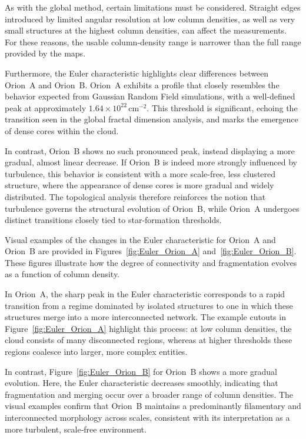 As with the global method, certain limitations must be considered.  
Straight edges introduced by limited angular resolution at low column densities, as well as very small structures at the highest column densities, can affect the measurements.  
For these reasons, the usable column‑density range is narrower than the full range provided by the maps.

Furthermore, the Euler characteristic highlights clear differences between Orion~A and Orion~B.  
Orion~A exhibits a profile that closely resembles the behavior expected from Gaussian Random Field simulations, with a well-defined peak at approximately \(1.64 \times 10^{22}\,\mathrm{cm}^{-2}\).  
This threshold is significant, echoing the transition seen in the global fractal dimension analysis, and marks the emergence of dense cores within the cloud.

In contrast, Orion~B shows no such pronounced peak, instead displaying a more gradual, almost linear decrease.  
If Orion~B is indeed more strongly influenced by turbulence, this behavior is consistent with a more scale-free, less clustered structure, where the appearance of dense cores is more gradual and widely distributed.  
The topological analysis therefore reinforces the notion that turbulence governs the structural evolution of Orion~B, while Orion~A undergoes distinct transitions closely tied to star-formation thresholds.

Visual examples of the changes in the Euler characteristic for Orion~A and Orion~B are provided in Figures~\ref{fig:Euler_Orion_A} and~\ref{fig:Euler_Orion_B}.  
These figures illustrate how the degree of connectivity and fragmentation evolves as a function of column density.  

In Orion~A, the sharp peak in the Euler characteristic corresponds to a rapid transition from a regime dominated by isolated structures to one in which these structures merge into a more interconnected network.  
The example cutouts in Figure~\ref{fig:Euler_Orion_A} highlight this process: at low column densities, the cloud consists of many disconnected regions, whereas at higher thresholds these regions coalesce into larger, more complex entities.

In contrast, Figure~\ref{fig:Euler_Orion_B} for Orion~B shows a more gradual evolution.  
Here, the Euler characteristic decreases smoothly, indicating that fragmentation and merging occur over a broader range of column densities.  
The visual examples confirm that Orion~B maintains a predominantly filamentary and interconnected morphology across scales, consistent with its interpretation as a more turbulent, scale‑free environment.

